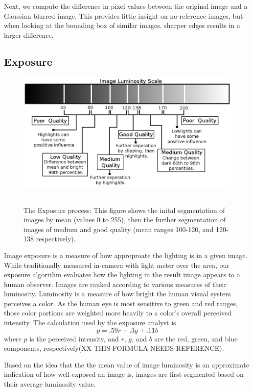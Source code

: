 \documentclass[10pt,twocolumn,letterpaper]{article}
\begin{document}
Next, we compute the difference in pixel values between the original image and a Gaussian blurred image. This provides little insight on no-reference images, but when looking at the bounding box of similar images, sharper edges results in a larger difference.

\subsection{Exposure}
\begin{figure}[t]
  \centering
    \includegraphics[scale=0.53,clip]{imageluminosity.eps}\
    \label{exposurefigure}
  \caption{The Exposure process: This figure shows the inital segmentation of images by mean (values 0 to 255), then the further segmentation of images of medium and good quality (mean ranges 100-120, and 120-138 respectively).}
\end{figure}
Image exposure is a measure of how approproate the lighting is in a given image.  While traditionally measured in-camera with light meter over the area, our exposure algorithm evaluates how the lighting in the result image appears to a human observer.  Images are ranked according to various measures of their luminosity.  Luminosity is a measure of how bright the human visual system perceives a color. As the human eye is most sensitive to green and red ranges, those color portions are weighted more heavily to a color's overall perceived intensity. The calculation used by the exposure analyst is
\[
p=.59r+.3g+.11b
\]
where \(p\) is the perceived intensity, and \(r\), \(g\), and \(b\) are the red, green, and blue components, respectively(XX THIS FORMULA NEEDS REFERENCE).

Based on the idea that the the mean value of image luminosity is an approximate indication of how well-exposed an image is, images are first segmented based on their average luminosity value.
\end{document}
